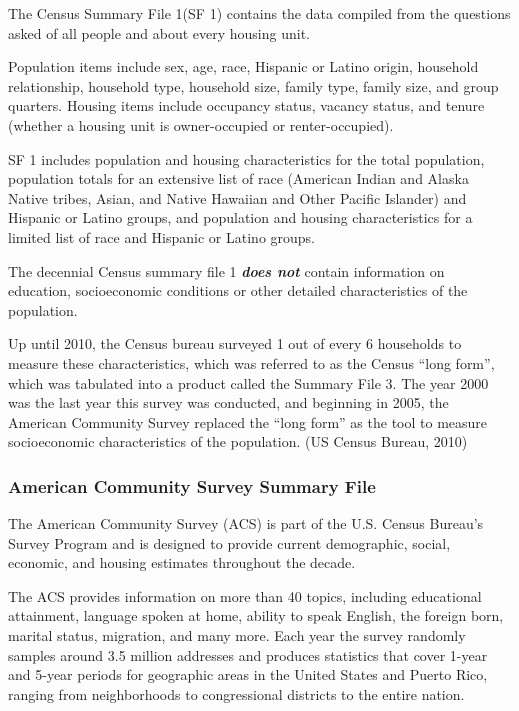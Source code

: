 \documentclass[]{article}
\begin{document}
The Census Summary File 1(SF 1) contains the data compiled from the
questions asked of all people and about every housing unit.

Population items include sex, age, race, Hispanic or Latino origin,
household relationship, household type, household size, family type,
family size, and group quarters. Housing items include occupancy status,
vacancy status, and tenure (whether a housing unit is owner-occupied or
renter-occupied).

SF 1 includes population and housing characteristics for the total
population, population totals for an extensive list of race (American
Indian and Alaska Native tribes, Asian, and Native Hawaiian and Other
Pacific Islander) and Hispanic or Latino groups, and population and
housing characteristics for a limited list of race and Hispanic or
Latino groups.

The decennial Census summary file 1 \textbf{\emph{does not}} contain
information on education, socioeconomic conditions or other detailed
characteristics of the population.

Up until 2010, the Census bureau surveyed 1 out of every 6 households to
measure these characteristics, which was referred to as the Census
``long form'', which was tabulated into a product called the Summary
File 3. The year 2000 was the last year this survey was conducted, and
beginning in 2005, the American Community Survey replaced the ``long
form'' as the tool to measure socioeconomic characteristics of the
population. (US Census Bureau, 2010)

\subsubsection{American Community Survey Summary
File}\label{american-community-survey-summary-file}

The American Community Survey (ACS) is part of the U.S. Census Bureau's
Survey Program and is designed to provide current demographic, social,
economic, and housing estimates throughout the decade.

The ACS provides information on more than 40 topics, including
educational attainment, language spoken at home, ability to speak
English, the foreign born, marital status, migration, and many more.
Each year the survey randomly samples around 3.5 million addresses and
produces statistics that cover 1-year and 5-year periods for geographic
areas in the United States and Puerto Rico, ranging from neighborhoods
to congressional districts to the entire nation.
\end{document}
